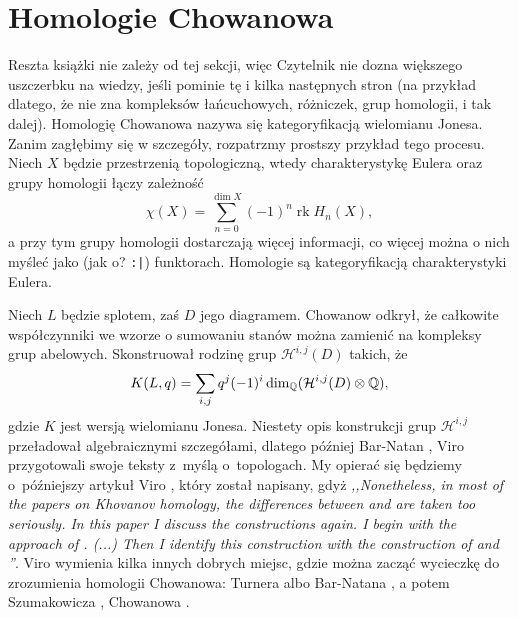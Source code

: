 
\section{Homologie Chowanowa}

Reszta książki nie zależy od tej sekcji, więc Czytelnik nie dozna większego uszczerbku na wiedzy, jeśli pominie tę i kilka następnych stron (na przykład dlatego, że nie zna kompleksów łańcuchowych, różniczek, grup homologii, i tak dalej).
Homologię Chowanowa nazywa się kategoryfikacją wielomianu Jonesa.
Zanim zagłębimy się w szczegóły, rozpatrzmy prostszy przykład tego procesu.
Niech $X$ będzie przestrzenią topologiczną, wtedy charakterystykę Eulera oraz grupy homologii łączy zależność
\begin{equation}
    \chi(X) = \sum_{n = 0}^{\dim X} (-1)^n \operatorname{rk} H_n(X),
\end{equation}
a przy tym grupy homologii dostarczają więcej informacji, co więcej można o nich myśleć jako (jak o? \texttt{:|}) funktorach.
Homologie są kategoryfikacją charakterystyki Eulera.

Niech $L$ będzie splotem, zaś $D$ jego diagramem.
Chowanow \cite{khovanov00} odkrył, że całkowite współczynniki we wzorze o sumowaniu stanów można zamienić na kompleksy grup abelowych.
Skonstruował rodzinę grup $\mathcal H^{i, j}(D)$ takich, że
\begin{equation}
    K(L, q) = \sum_{i, j} q^j (-1)^i \dim_\mathbb Q (\mathcal H^{i, j}(D) \otimes \mathbb Q),
\end{equation}
gdzie $K$ jest wersją wielomianu Jonesa.
Niestety opis konstrukcji grup $\mathcal H^{i, j}$ przeładował algebraicznymi szczegółami, dlatego później Bar-Natan \cite{barnatan02}, Viro \cite{viro02} przygotowali swoje teksty z~myślą o~topologach.
%
%
My opierać się będziemy o~późniejszy artykuł Viro \cite{viro04}, który został napisany, gdyż \emph{,,Nonetheless, in most of the papers on Khovanov homology, the differences between \cite{barnatan02} and \cite{viro02} are taken too seriously. In this paper I discuss the constructions again. I begin with the approach of \cite{viro02}. (...) Then I identify this construction with the construction of \cite{barnatan02} and \cite{khovanov00}''}.
Viro \cite{viro04} wymienia kilka innych dobrych miejsc, gdzie można zacząć wycieczkę do zrozumienia homologii Chowanowa: Turnera \cite{turner17} albo Bar-Natana \cite{barnatan02}, a potem Szumakowicza \cite{shumakovitch12}, Chowanowa \cite{khovanov00}.
%
%
%
%

